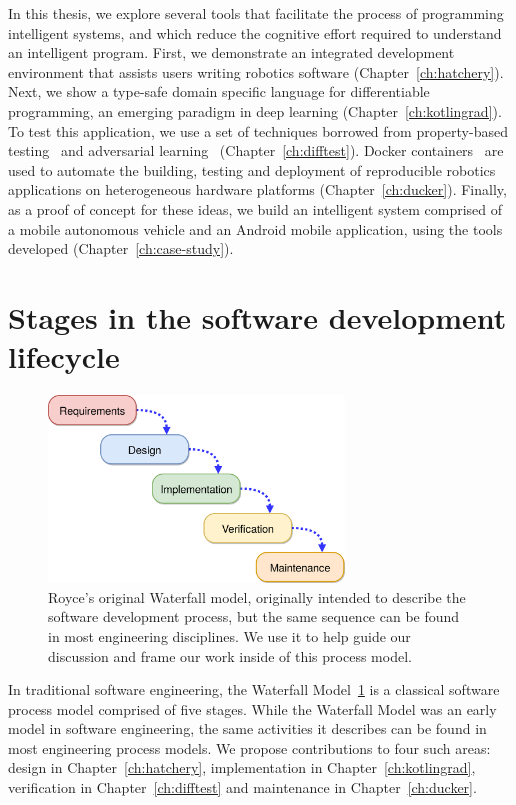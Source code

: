 \documentclass[12pt,initial,twoside,maitrise]{dms}
\numberwithin{equation}{section}
\numberwithin{table}{chapter}
\numberwithin{figure}{chapter}
\begin{document}
In this thesis, we explore several tools that facilitate the process of programming intelligent systems, and which reduce the cognitive effort required to understand an intelligent program. First, we demonstrate an integrated development environment that assists users writing robotics software (Chapter~\ref{ch:hatchery}). Next, we show a type-safe domain specific language for differentiable programming, an emerging paradigm in deep learning (Chapter~\ref{ch:kotlingrad}). To test this application, we use a set of techniques borrowed from property-based testing~\cite{fink1997property} and adversarial learning~\cite{lowd2005adversarial} (Chapter~\ref{ch:difftest}). Docker containers~\cite{merkel2014docker} are used to automate the building, testing and deployment of reproducible robotics applications on heterogeneous hardware platforms (Chapter~\ref{ch:ducker}). Finally, as a proof of concept for these ideas, we build an intelligent system comprised of a mobile autonomous vehicle and an Android mobile application, using the tools developed (Chapter~\ref{ch:case-study}).

\section{Stages in the software development lifecycle}\label{sec:sldc-stages}

\begin{figure}
    \centering
    \includegraphics[width=0.70\textwidth]{waterfall_diagram.png}
    \caption{Royce's original Waterfall model, originally intended to describe the software development process, but the same sequence can be found in most engineering disciplines. We use it to help guide our discussion and frame our work inside of this process model.\vspace{-10}}
    \label{fig:waterfall_model}
\end{figure}

In traditional software engineering, the Waterfall Model~\ref{fig:waterfall_model} is a classical software process model comprised of five stages. While the Waterfall Model was an early model in software engineering, the same activities it describes can be found in most engineering process models. We propose contributions to four such areas: design in Chapter~\ref{ch:hatchery}, implementation in Chapter~\ref{ch:kotlingrad}, verification in Chapter~\ref{ch:difftest} and maintenance in Chapter~\ref{ch:ducker}.
\end{document}
